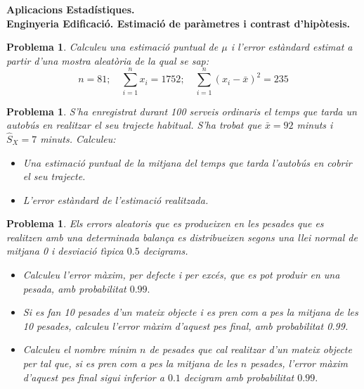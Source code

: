 \documentclass[11pt]{article}
\newcounter{prbcont}
\newtheorem{problema}[prbcont]{Problema}
\begin{document}
\begin{center}
\textbf{{\large {Aplicacions Estad\'{i}stiques. }\\}}
\vspace{0.5cm}
\textbf{Enginyeria Edificaci\'o. Estimaci\'o de par\`ametres i contrast d'hip\`otesis.}
\end{center}


\begin{problema}
Calculeu una estimaci\'o puntual de $\mu$ i l'error est\`andard estimat a partir d'una mostra
aleat\`oria de la qual se sap:
\[ n = 81;\quad \sum_{i=1}^n x_i = 1752;\quad \sum_{i=1}^n (x_i - \bar{x})^2 = 235 \]
\end{problema}

\begin{problema}
S'ha enregistrat durant 100 serveis ordinaris el temps que tarda un autob\'us en realitzar
el seu trajecte habitual. S'ha trobat que $\bar{x} = 92$ minuts i $\hat{S}_{X} = 7$ minuts. Calculeu:
\begin{itemize}
\item [(a)] Una estimaci\'o puntual de la mitjana del temps que tarda l'autob\'us en cobrir el
seu trajecte.
\item [(b)] L'error est\`andard de l'estimaci\'o realitzada.
\end{itemize}
\end{problema}

\begin{problema}
Els errors aleatoris que es produeixen en les pesades que es realitzen amb una determinada
balan\c{c}a es distribueixen segons una llei normal de mitjana 0 i desviaci\'o t\`{\i}pica
$0.5$ decigrams.
\begin{itemize}
\item [(a)] Calculeu l'error m\`axim, per defecte i per exc\'es, que es pot produir en una pesada,
amb probabilitat $0.99.$ %
\item [(b)] Si es fan 10 pesades d'un mateix objecte i es pren com a pes la mitjana de les 10
pesades, calculeu l'error m\`axim d'aquest pes final, amb probabilitat 0.99. %
\item [(c)] Calculeu el nombre m\'{\i}nim $n$ de pesades que cal realitzar d'un mateix objecte per
tal que, si es pren com a pes la mitjana de les $n$ pesades, l'error m\`axim d'aquest
pes final sigui inferior a $0.1$ decigram amb probabilitat $0.99.$ %
\end{itemize}
\end{problema}
\end{document}
